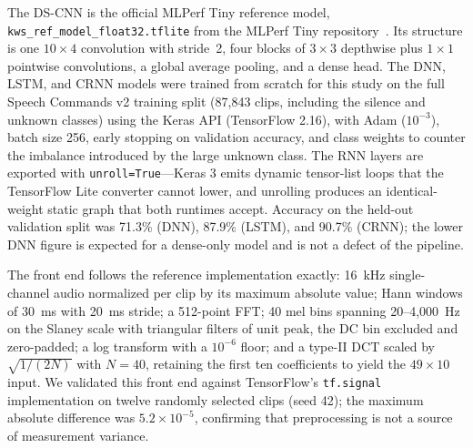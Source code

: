 \documentclass[conference,a4paper]{IEEEtran}
\begin{document}
\begin{table}[t]
\caption{Benchmark model set. All models share the $49\times10\times1$ MFCC input and a 12-way softmax head.}
\label{tab:models}
\centering
{\footnotesize
\setlength{\tabcolsep}{3pt}
}
\end{table}

The DS-CNN is the official MLPerf Tiny reference model, \texttt{kws\_ref\_model\_float32.tflite} from the MLPerf Tiny repository~\cite{mlcompostiny}. Its structure is one $10\times4$ convolution with stride~2, four blocks of $3\times3$ depthwise plus $1\times1$ pointwise convolutions, a global average pooling, and a dense head. The DNN, LSTM, and CRNN models were trained from scratch for this study on the full Speech Commands v2 training split (87{,}843 clips, including the silence and unknown classes) using the Keras API (TensorFlow 2.16), with Adam ($10^{-3}$), batch size 256, early stopping on validation accuracy, and class weights to counter the imbalance introduced by the large unknown class. The RNN layers are exported with \texttt{unroll=True}---Keras 3 emits dynamic tensor-list loops that the TensorFlow Lite converter cannot lower, and unrolling produces an identical-weight static graph that both runtimes accept. Accuracy on the held-out validation split was 71.3\% (DNN), 87.9\% (LSTM), and 90.7\% (CRNN); the lower DNN figure is expected for a dense-only model and is not a defect of the pipeline.

The front end follows the reference implementation exactly: 16~kHz single-channel audio normalized per clip by its maximum absolute value; Hann windows of 30~ms with 20~ms stride; a 512-point FFT; 40 mel bins spanning 20--4{,}000~Hz on the Slaney scale with triangular filters of unit peak, the DC bin excluded and zero-padded; a log transform with a $10^{-6}$ floor; and a type-II DCT scaled by $\sqrt{1/(2N)}$ with $N=40$, retaining the first ten coefficients to yield the $49\times10$ input. We validated this front end against TensorFlow's \texttt{tf.signal} implementation on twelve randomly selected clips (seed 42); the maximum absolute difference was $5.2\times10^{-5}$, confirming that preprocessing is not a source of measurement variance.
\end{document}
